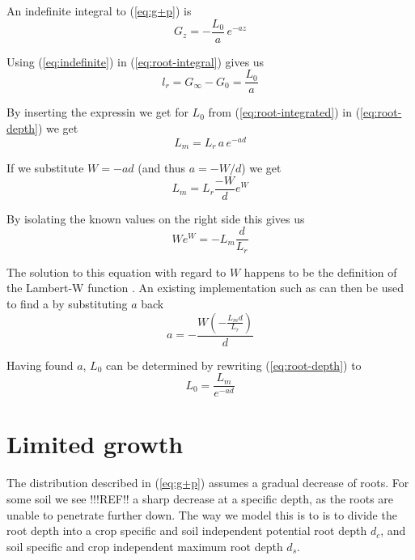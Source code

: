 \documentclass[a4paper,11pt,twoside]{article}
\begin{document}
An indefinite integral to (\ref{eq:g+p}) is 
\begin{equation}
  G_z = -\frac{L_0}{a}\, e^{-a z}
  \label{eq:indefinite}
\end{equation}

Using (\ref{eq:indefinite}) in (\ref{eq:root-integral}) gives us
\begin{equation}
    l_r = G_{\infty} - G_0 = \frac{L_0}{a}
  \label{eq:root-integrated}
\end{equation}

By inserting the expressin we get for $L_0$ from
(\ref{eq:root-integrated}) in (\ref{eq:root-depth}) we get
\begin{equation}
  L_m = L_r \, a \, e^{-a d}
  \label{eq:a-only}
\end{equation}

If we substitute $W = -a d$ (and thus $a = -W / d$) we get
\begin{equation}
   L_m = L_r \frac{-W}{d} e^W
  \label{eq:sub-W}
\end{equation}

By isolating the known values on the right side this gives us
\begin{equation}
   W e^W = - L_m \frac{d}{L_r}
  \label{eq:Lambert}
\end{equation}

The solution to this equation with regard to $W$ happens to be the
definition of the Lambert-W function \citep{euler83,lambert58}.  An
existing implementation such as \citep{lambertwcode} can then be used
to find a by substituting $a$ back
\begin{equation}
   a = -\frac{W (-\frac{L_m d}{L_r})}{d}
  \label{eq:a-solved}
\end{equation}

Having found $a$, $L_0$ can be determined by rewriting (\ref{eq:root-depth}) to
\begin{equation}
  L_0 = \frac{L_m}{e^{-a d}}
  \label{eq:L0-found}
\end{equation}

\section{Limited growth}

The distribution described in (\ref{eq:g+p}) assumes a gradual
decrease of roots.  For some soil we see !!!REF!! a sharp decrease at
a specific depth, as the roots are unable to penetrate further down.
The way we model this is to is to divide the root depth into a crop
specific and soil independent potential root depth $d_c$, and soil
specific and crop independent maximum root depth $d_s$.
\end{document}
